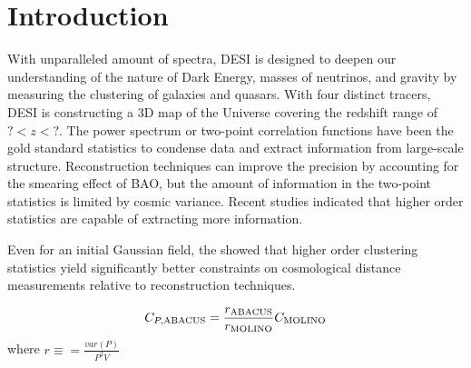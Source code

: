\section{Introduction}
\label{sec:introduction}
With unparalleled amount of spectra, DESI is designed to deepen our understanding of the nature of Dark Energy, masses of neutrinos, and gravity by measuring the clustering of galaxies and quasars. With four distinct tracers, DESI is constructing a 3D map of the Universe covering the redshift range of $? < z < ?$. The power spectrum or two-point correlation functions have been the gold standard statistics to condense data and extract information from large-scale structure. Reconstruction techniques can improve the precision by accounting for the smearing effect of BAO, but the amount of information in the two-point statistics is limited by cosmic variance. Recent studies indicated that higher order statistics are capable of extracting more information.

Even for an initial Gaussian field, the \cite{samushia2021information} showed that higher order clustering statistics yield significantly better constraints on cosmological distance measurements relative to reconstruction techniques. 



\begin{equation}
	C_{P, {\rm ABACUS}} = \frac{r_{\rm ABACUS}}{r_{\rm MOLINO}} C_{\rm MOLINO}
\end{equation}
where $r \equiv = \frac{var(P)}{P^{2}V}$

%
%
%
%
%



